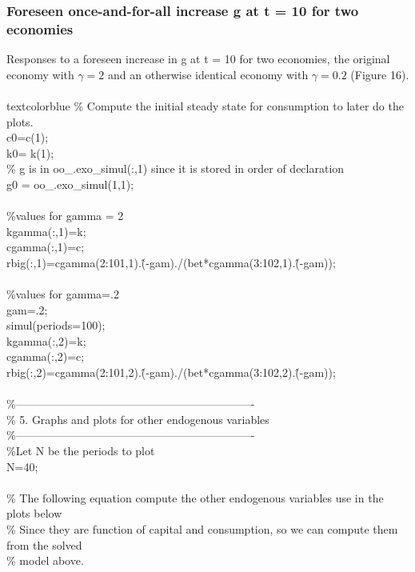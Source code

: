 \documentclass[a4paper,12pt]{scrartcl} %
\begin{document}
\subsubsection{Foreseen once-and-for-all increase g at t = 10 for two economies}

Responses to a foreseen increase in g at t = 10 for two economies, the original economy with $\gamma=2$ and an otherwise identical economy with $\gamma=0.2$ (Figure 16).\\
\\
textcolor{blue}{
\% Compute the initial steady state for consumption to later do the plots.\\
c0=c(1);\\
k0= k(1);\\
\% g is in oo\_.exo\_simul(:,1) since it is stored in order of declaration\\
g0 = oo\_.exo\_simul(1,1);\\
\\
\%values for gamma = 2\\
kgamma(:,1)=k;\\
cgamma(:,1)=c;\\
rbig(:,1)=cgamma(2:101,1).\^(-gam)./(bet*cgamma(3:102,1).\^(-gam));\\
\\
\%values for gamma=.2\\
gam=.2;\\
simul(periods=100);\\
kgamma(:,2)=k;\\
cgamma(:,2)=c;\\
rbig(:,2)=cgamma(2:101,2).\^(-gam)./(bet*cgamma(3:102,2).\^(-gam));\\
\\
\%----------------------------------------------------------------\\
\% 5. Graphs and plots for other endogenous variables\\
\%----------------------------------------------------------------\\
\%Let N be the periods to plot\\
N=40;\\
\\
\% The following equation compute the other endogenous variables use in the plots below\\
\% Since they are function of capital and consumption, so we can compute them from the solved\\
\% model above.\\
\\
}
\end{document}
